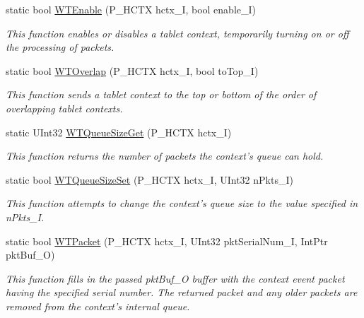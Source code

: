 \begin{DoxyCompactItemize}
static bool \hyperlink{class_wintab_d_n_1_1_c_wintab_funcs_ac95222347f25482ef10ec9619881c4d6}{WTEnable} (P\_\-HCTX hctx\_\-I, bool enable\_\-I)
\begin{DoxyCompactList}\small\item\em This function enables or disables a tablet context, temporarily turning on or off the processing of packets. \item\end{DoxyCompactList}\item 
static bool \hyperlink{class_wintab_d_n_1_1_c_wintab_funcs_a2ff68c48cdfa2b610e95e2088073fdb5}{WTOverlap} (P\_\-HCTX hctx\_\-I, bool toTop\_\-I)
\begin{DoxyCompactList}\small\item\em This function sends a tablet context to the top or bottom of the order of overlapping tablet contexts. \item\end{DoxyCompactList}\item 
static UInt32 \hyperlink{class_wintab_d_n_1_1_c_wintab_funcs_a87f5573c610b759ad6da04d1dd20f8c3}{WTQueueSizeGet} (P\_\-HCTX hctx\_\-I)
\begin{DoxyCompactList}\small\item\em This function returns the number of packets the context's queue can hold. \item\end{DoxyCompactList}\item 
static bool \hyperlink{class_wintab_d_n_1_1_c_wintab_funcs_a3dce149610861d43038221c8be3c2262}{WTQueueSizeSet} (P\_\-HCTX hctx\_\-I, UInt32 nPkts\_\-I)
\begin{DoxyCompactList}\small\item\em This function attempts to change the context's queue size to the value specified in nPkts\_\-I. \item\end{DoxyCompactList}\item 
static bool \hyperlink{class_wintab_d_n_1_1_c_wintab_funcs_ae48b913853eadb05992c1d6688c9825d}{WTPacket} (P\_\-HCTX hctx\_\-I, UInt32 pktSerialNum\_\-I, IntPtr pktBuf\_\-O)
\begin{DoxyCompactList}\small\item\em This function fills in the passed pktBuf\_\-O buffer with the context event packet having the specified serial number. The returned packet and any older packets are removed from the context's internal queue. \item\end{DoxyCompactList}\item 

\end{DoxyCompactItemize}
